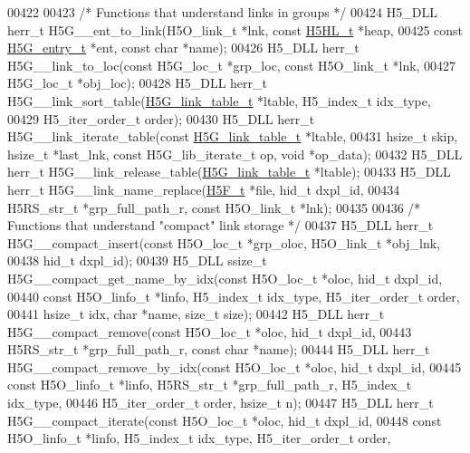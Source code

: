 \begin{DoxyCode}
00422 
00423 \textcolor{comment}{/* Functions that understand links in groups */}
00424 H5\_DLL herr\_t H5G\_\_ent\_to\_link(H5O\_link\_t *lnk, \textcolor{keyword}{const} \hyperlink{struct_h5_h_l__t}{H5HL\_t} *heap,
00425     \textcolor{keyword}{const} \hyperlink{struct_h5_g__entry__t}{H5G\_entry\_t} *ent, \textcolor{keyword}{const} \textcolor{keywordtype}{char} *name);
00426 H5\_DLL herr\_t H5G\_\_link\_to\_loc(\textcolor{keyword}{const} H5G\_loc\_t *grp\_loc, \textcolor{keyword}{const} H5O\_link\_t *lnk,
00427     H5G\_loc\_t *obj\_loc);
00428 H5\_DLL herr\_t H5G\_\_link\_sort\_table(\hyperlink{struct_h5_g__link__table__t}{H5G\_link\_table\_t} *ltable, H5\_index\_t idx\_type,
00429     H5\_iter\_order\_t order);
00430 H5\_DLL herr\_t H5G\_\_link\_iterate\_table(\textcolor{keyword}{const} \hyperlink{struct_h5_g__link__table__t}{H5G\_link\_table\_t} *ltable,
00431     hsize\_t skip, hsize\_t *last\_lnk, \textcolor{keyword}{const} H5G\_lib\_iterate\_t op, \textcolor{keywordtype}{void} *op\_data);
00432 H5\_DLL herr\_t H5G\_\_link\_release\_table(\hyperlink{struct_h5_g__link__table__t}{H5G\_link\_table\_t} *ltable);
00433 H5\_DLL herr\_t H5G\_\_link\_name\_replace(\hyperlink{struct_h5_f__t}{H5F\_t} *file, hid\_t dxpl\_id,
00434     H5RS\_str\_t *grp\_full\_path\_r, \textcolor{keyword}{const} H5O\_link\_t *lnk);
00435 
00436 \textcolor{comment}{/* Functions that understand "compact" link storage */}
00437 H5\_DLL herr\_t H5G\_\_compact\_insert(\textcolor{keyword}{const} H5O\_loc\_t *grp\_oloc, H5O\_link\_t *obj\_lnk,
00438     hid\_t dxpl\_id);
00439 H5\_DLL ssize\_t H5G\_\_compact\_get\_name\_by\_idx(\textcolor{keyword}{const} H5O\_loc\_t *oloc, hid\_t dxpl\_id,
00440     \textcolor{keyword}{const} H5O\_linfo\_t *linfo, H5\_index\_t idx\_type, H5\_iter\_order\_t order,
00441     hsize\_t idx, \textcolor{keywordtype}{char} *name, \textcolor{keywordtype}{size\_t} size);
00442 H5\_DLL herr\_t H5G\_\_compact\_remove(\textcolor{keyword}{const} H5O\_loc\_t *oloc, hid\_t dxpl\_id,
00443     H5RS\_str\_t *grp\_full\_path\_r, \textcolor{keyword}{const} \textcolor{keywordtype}{char} *name);
00444 H5\_DLL herr\_t H5G\_\_compact\_remove\_by\_idx(\textcolor{keyword}{const} H5O\_loc\_t *oloc, hid\_t dxpl\_id,
00445     \textcolor{keyword}{const} H5O\_linfo\_t *linfo, H5RS\_str\_t *grp\_full\_path\_r, H5\_index\_t idx\_type,
00446     H5\_iter\_order\_t order, hsize\_t n);
00447 H5\_DLL herr\_t H5G\_\_compact\_iterate(\textcolor{keyword}{const} H5O\_loc\_t *oloc, hid\_t dxpl\_id,
00448     \textcolor{keyword}{const} H5O\_linfo\_t *linfo, H5\_index\_t idx\_type, H5\_iter\_order\_t order,

\end{DoxyCode}
